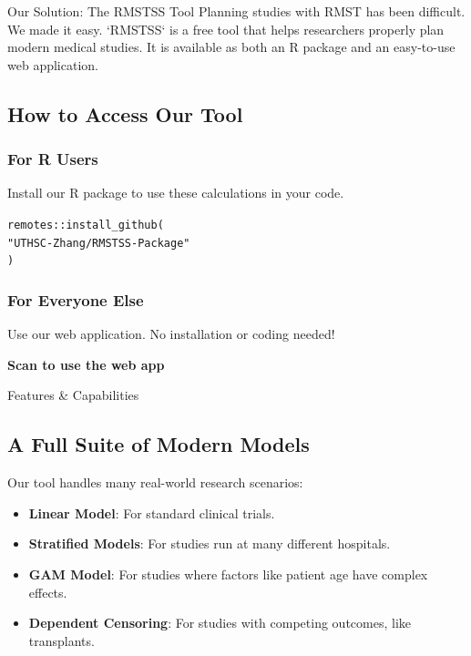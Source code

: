\documentclass[a0,landscape]{a0poster}
\begin{document}
\begin{multicols}{3}
\begin{posterbox}{Our Solution: The RMSTSS Tool}
    \huge
    Planning studies with RMST has been difficult. We made it easy.
    `RMSTSS` is a free tool that helps researchers properly plan modern medical studies. It is available as both an R package and an easy-to-use web application.
    
    \subsection*{\Huge How to Access Our Tool}
    \subsubsection*{\huge For R Users}
    \Large
    Install our R package to use these calculations in your code.
    \begin{alltt}
remotes::install_github(
  "UTHSC-Zhang/RMSTSS-Package"
)
    \end{alltt}

    \subsubsection*{\huge For Everyone Else}
    \Large
    Use our web application. No installation or coding needed!
    \begin{center}
        
        \textbf{\huge Scan to use the web app}
    \end{center}
\end{posterbox}

\columnbreak

\begin{posterbox}{Features \& Capabilities}

    \subsection*{\Huge A Full Suite of Modern Models}
    \huge
    Our tool handles many real-world research scenarios:
    \begin{itemize} \itemsep=0.75em
        \item \textbf{Linear Model}: For standard clinical trials.
        \item \textbf{Stratified Models}: For studies run at many different hospitals.
        \item \textbf{GAM Model}: For studies where factors like patient age have complex effects.
        \item \textbf{Dependent Censoring}: For studies with competing outcomes, like transplants.
    \end{itemize}


\end{posterbox}
\end{multicols}
\end{document}
